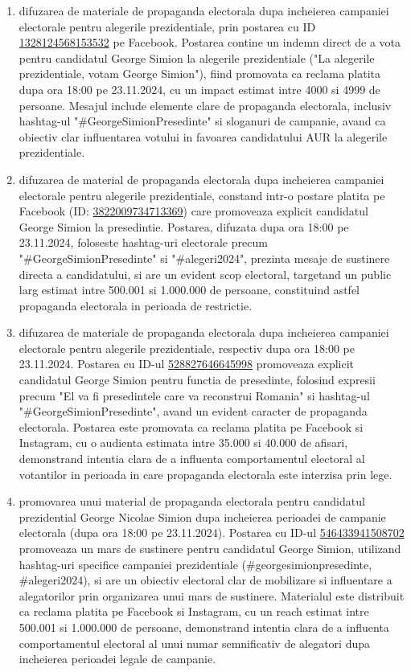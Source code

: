 \documentclass[a4paper,12pt]{article}
\begin{document}
\begin{enumerate}[leftmargin=*, label=\arabic*.)]
    \item difuzarea de materiale de propaganda electorala dupa incheierea campaniei electorale pentru alegerile prezidentiale, prin postarea cu ID \href{https://www.facebook.com/ads/library/?id=1328124568153532}{1328124568153532} pe Facebook. Postarea contine un indemn direct de a vota pentru candidatul George Simion la alegerile prezidentiale ("La alegerile prezidentiale, votam George Simion"), fiind promovata ca reclama platita dupa ora 18:00 pe 23.11.2024, cu un impact estimat intre 4000 si 4999 de persoane. Mesajul include elemente clare de propaganda electorala, inclusiv hashtag-ul "\#GeorgeSimionPresedinte" si sloganuri de campanie, avand ca obiectiv clar influentarea votului in favoarea candidatului AUR la alegerile prezidentiale.
    \item difuzarea de material de propaganda electorala dupa incheierea campaniei electorale pentru alegerile prezidentiale, constand intr-o postare platita pe Facebook (ID: \href{https://www.facebook.com/ads/library/?id=3822009734713369}{3822009734713369}) care promoveaza explicit candidatul George Simion la presedintie. Postarea, difuzata dupa ora 18:00 pe 23.11.2024, foloseste hashtag-uri electorale precum "\#GeorgeSimionPresedinte" si "\#alegeri2024", prezinta mesaje de sustinere directa a candidatului, si are un evident scop electoral, targetand un public larg estimat intre 500.001 si 1.000.000 de persoane, constituind astfel propaganda electorala in perioada de restrictie.
    \item difuzarea de materiale de propaganda electorala dupa incheierea campaniei electorale pentru alegerile prezidentiale, respectiv dupa ora 18:00 pe 23.11.2024. Postarea cu ID-ul \href{https://www.facebook.com/ads/library/?id=528827646645998}{528827646645998} promoveaza explicit candidatul George Simion pentru functia de presedinte, folosind expresii precum "El va fi presedintele care va reconstrui Romania" si hashtag-ul "\#GeorgeSimionPresedinte", avand un evident caracter de propaganda electorala. Postarea este promovata ca reclama platita pe Facebook si Instagram, cu o audienta estimata intre 35.000 si 40.000 de afisari, demonstrand intentia clara de a influenta comportamentul electoral al votantilor in perioada in care propaganda electorala este interzisa prin lege.
    \item promovarea unui material de propaganda electorala pentru candidatul prezidential George Nicolae Simion dupa incheierea perioadei de campanie electorala (dupa ora 18:00 pe 23.11.2024). Postarea cu ID-ul \href{https://www.facebook.com/ads/library/?id=546433941508702}{546433941508702} promoveaza un mars de sustinere pentru candidatul George Simion, utilizand hashtag-uri specifice campaniei prezidentiale (\#georgesimionpresedinte, \#alegeri2024), si are un obiectiv electoral clar de mobilizare si influentare a alegatorilor prin organizarea unui mars de sustinere. Materialul este distribuit ca reclama platita pe Facebook si Instagram, cu un reach estimat intre 500.001 si 1.000.000 de persoane, demonstrand intentia clara de a influenta comportamentul electoral al unui numar semnificativ de alegatori dupa incheierea perioadei legale de campanie.

\end{enumerate}
\end{document}
